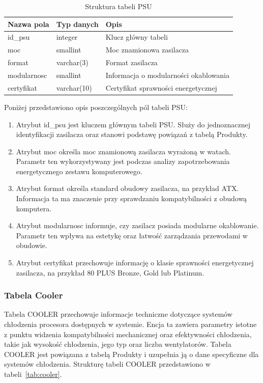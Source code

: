 \documentclass[a4paper,twoside,12pt]{book}
\begin{document}
\begin{table}[H]
\centering
\caption{Struktura tabeli PSU}
\label{tab:psu}
\begin{tabular}{lll}
\hline
Nazwa pola & Typ danych & Opis \\ \hline
id\_psu & integer & Klucz główny tabeli \\
moc & smallint & Moc znamionowa zasilacza \\
format & varchar(3) & Format zasilacza \\
modularnosc & smallint & Informacja o modularności okablowania \\
certyfikat & varchar(10) & Certyfikat sprawności energetycznej \\ \hline
\end{tabular}
\end{table}

Poniżej przedstawiono opis poszczególnych pól tabeli PSU:

\begin{enumerate}
    \item Atrybut id\_psu jest kluczem głównym tabeli PSU. Służy do jednoznacznej
    identyfikacji zasilacza oraz stanowi podstawę powiązań z tabelą Produkty.

    \item Atrybut moc określa moc znamionową zasilacza wyrażoną w watach. Parametr
    ten wykorzystywany jest podczas analizy zapotrzebowania energetycznego
    zestawu komputerowego.

    \item Atrybut format określa standard obudowy zasilacza, na przykład ATX.
    Informacja ta ma znaczenie przy sprawdzaniu kompatybilności z obudową
    komputera.

    \item Atrybut modularnosc informuje, czy zasilacz posiada modularne
    okablowanie. Parametr ten wpływa na estetykę oraz łatwość zarządzania
    przewodami w obudowie.

    \item Atrybut certyfikat przechowuje informację o klasie sprawności
    energetycznej zasilacza, na przykład 80 PLUS Bronze, Gold lub Platinum.
\end{enumerate}

\newpage 
\subsubsection{Tabela Cooler}
Tabela COOLER przechowuje informacje techniczne dotyczące systemów chłodzenia
procesora dostępnych w systemie. Encja ta zawiera parametry istotne z punktu
widzenia kompatybilności mechanicznej oraz efektywności chłodzenia, takie jak
wysokość chłodzenia, jego typ oraz liczba wentylatorów. Tabela COOLER jest
powiązana z tabelą Produkty i uzupełnia ją o dane specyficzne dla systemów
chłodzenia. Strukturę tabeli COOLER przedstawiono w tabeli~\ref{tab:cooler}.
\end{document}
